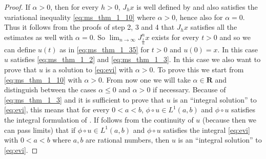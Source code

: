 \documentclass[a4paper,11pt, leqno]{scrreprt} %
\renewcommand{\leq}{\leqslant}
\renewcommand{\leq}{\leqslant}
\newcommand{\R}{\mathbf R}
\theoremstyle{change}
\theoremstyle{nonumberplain}
\newtheorem{proof}{Proof}
\begin{document}
\begin{proof}
  If $\alpha > 0$, then for every $h > 0$, $J_h x$ is well defined by
   and also satisfies the variational inequality
  \eqref{eq:ms_thm_1_10} where $\alpha > 0$, hence also for $\alpha =
  0$. Thus it follows from the proofs of step 2, 3 and 4 that $J_h x$
  satisfies all the estimates as well with $\alpha = 0$. So $\lim_{n
  \to \infty} J_{\frac{t}{n}}^n x$ exists for every $t > 0$ and so we
  can define $u(t)$ as in \eqref{eq:ms_thm_1_35} for $t > 0$ and
  $u(0) = x$. In this case $u$ satisfies \eqref{eq:ms_thm_1_2} and
  \eqref{eq:ms_thm_1_3}. In this case we also want to prove that $u$
  is a solution to \eqref{eq:evi} with $\alpha > 0$. To prove this
  we start from \eqref{eq:ms_thm_1_10} with $\alpha > 0$. From now
  one we will take $\alpha \in \R$ and distinguish between the cases
  $\alpha \leq 0$ and $\alpha > 0$ if necessary. Because of
  \eqref{eq:ms_thm_1_3} and  it is sufficient to
  prove that $u$ is an ``integral solution'' to \eqref{eq:evi}, this
  means that for every $0 < a < b$, $\phi \circ u \in L^1(a,b)$ and
  $\phi \circ u$ satisfies the integral formulation of
  . If follows from the continuity of $u$
  (because then we can pass limits) that if $\phi \circ u \in
  L^1(a,b)$ and $\phi \circ u$ satisfies the integral \ref{eq:evi}
  with $0 < a < b$ where $a, b$ are rational numbers, then $u$ is an
  ``integral solution'' to \eqref{eq:evi}.


\end{proof}
\end{document}
